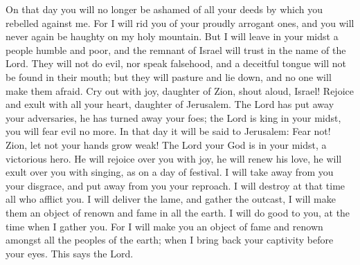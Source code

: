  On that day you will no longer be ashamed of all your
deeds by which you rebelled against me. For I will rid you of your
proudly arrogant ones, and you will never again be haughty on my holy
mountain.  But I will leave in your midst a people humble
and poor, and the remnant of Israel will trust in the name of the Lord.
 They will not do evil, nor speak falsehood, and a
deceitful tongue will not be found in their mouth; but they will pasture
and lie down, and no one will make them afraid.  Cry out
with joy, daughter of Zion, shout aloud, Israel! Rejoice and exult with
all your heart, daughter of Jerusalem.  The Lord has put
away your adversaries, he has turned away your foes; the Lord is king in
your midst, you will fear evil no more.  In that day it
will be said to Jerusalem: Fear not! Zion, let not your hands grow weak!
 The Lord your God is in your midst, a victorious hero. He
will rejoice over you with joy, he will renew his love, he will exult
over you with singing,  as on a day of festival. I will
take away from you your disgrace, and put away from you your reproach.
 I will destroy at that time all who afflict you. I will
deliver the lame, and gather the outcast, I will make them an object of
renown and fame in all the earth.  I will do good to you,
at the time when I gather you. For I will make you an object of fame and
renown amongst all the peoples of the earth; when I bring back your
captivity before your eyes. This says the Lord.
